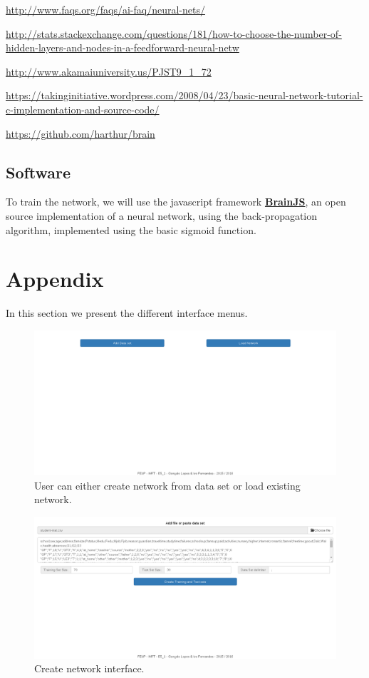 \documentclass[11pt]{article}
\begin{document}
\url{http://www.faqs.org/faqs/ai-faq/neural-nets/}

\url{http://stats.stackexchange.com/questions/181/how-to-choose-the-number-of-hidden-layers-and-nodes-in-a-feedforward-neural-netw}

\url{http://www.akamaiuniversity.us/PJST9_1_72}

\url{https://takinginitiative.wordpress.com/2008/04/23/basic-neural-network-tutorial-c-implementation-and-source-code/}

\url{https://github.com/harthur/brain}

\subsection{Software}

To train the network, we will use the javascript framework \href{https://github.com/harthur/brain}{\textbf{BrainJS}}, an open source implementation of a neural network, using the back-propagation algorithm, implemented using the basic sigmoid function.

\newpage
\section{Appendix}
In this section we present the different interface menus.

\begin{figure}[H]
\label{fig:example}
\includegraphics[scale=0.3]{interface0.png}
\centering
\caption{User can either create network from data set or load existing network.}
\end{figure}

\begin{figure}[H]
\label{fig:example}
\includegraphics[scale=0.3]{interface1.png}
\centering
\caption{Create network interface.}
\end{figure}
\end{document}
